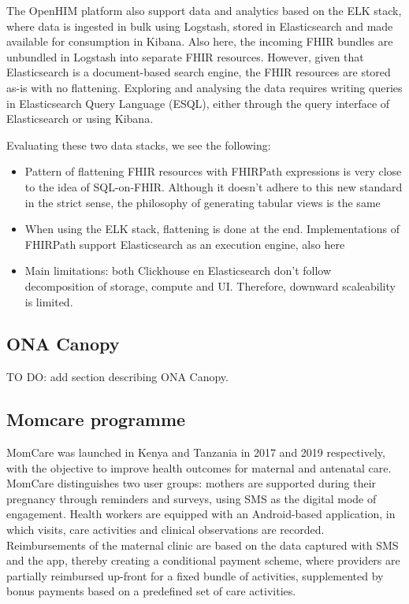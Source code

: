 \documentclass[
  authoryear]{elsarticle}
\providecommand{\tightlist}{%
  \setlength{\itemsep}{0pt}\setlength{\parskip}{0pt}}\usepackage{longtable,booktabs,array}
\begin{document}
The OpenHIM platform also support data and analytics based on the ELK
stack, where data is ingested in bulk using Logstash, stored in
Elasticsearch and made available for consumption in Kibana. Also here,
the incoming FHIR bundles are unbundled in Logstash into separate FHIR
resources. However, given that Elasticsearch is a document-based search
engine, the FHIR resources are stored as-is with no flattening.
Exploring and analysing the data requires writing queries in
Elasticsearch Query Language (ES\textbar QL), either through the query
interface of Elasticsearch or using Kibana.

Evaluating these two data stacks, we see the following:

\begin{itemize}
\tightlist
\item
  Pattern of flattening FHIR resources with FHIRPath expressions is very
  close to the idea of SQL-on-FHIR. Although it doesn't adhere to this
  new standard in the strict sense, the philosophy of generating tabular
  views is the same
\item
  When using the ELK stack, flattening is done at the end.
  Implementations of FHIRPath support Elasticsearch as an execution
  engine, also here
\item
  Main limitations: both Clickhouse en Elasticsearch don't follow
  decomposition of storage, compute and UI. Therefore, downward
  scaleability is limited.
\end{itemize}

\subsection{ONA Canopy}\label{ona-canopy}

TO DO: add section describing ONA Canopy.

\subsection{Momcare programme}\label{momcare-programme}

MomCare was launched in Kenya
\citep{huisman2022digital, sanctis2022maintaining} and Tanzania
\citep{shija2021access, mrema2021application} in 2017 and 2019
respectively, with the objective to improve health outcomes for maternal
and antenatal care. MomCare distinguishes two user groups: mothers are
supported during their pregnancy through reminders and surveys, using
SMS as the digital mode of engagement. Health workers are equipped with
an Android-based application, in which visits, care activities and
clinical observations are recorded. Reimbursements of the maternal
clinic are based on the data captured with SMS and the app, thereby
creating a conditional payment scheme, where providers are partially
reimbursed up-front for a fixed bundle of activities, supplemented by
bonus payments based on a predefined set of care activities.
\end{document}
